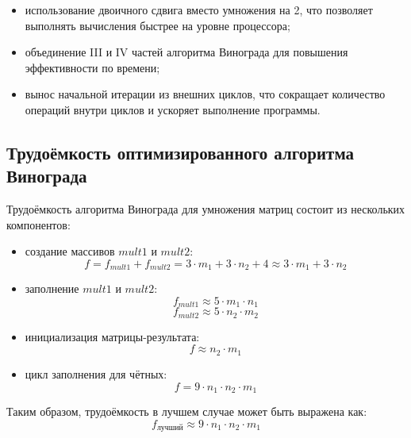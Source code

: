 \documentclass[a4paper, 12pt]{extreport}
\begin{document}
\begin{itemize}
    \item[--] использование двоичного сдвига вместо умножения на 2, что позволяет выполнять вычисления быстрее на уровне процессора;
    \item[--] объединение III и IV частей алгоритма Винограда для повышения эффективности по времени;
    \item[--] вынос начальной итерации из внешних циклов, что сокращает количество операций внутри циклов и ускоряет выполнение программы.
\end{itemize}

\subsection{Трудоёмкость оптимизированного алгоритма Винограда}

Трудоёмкость алгоритма Винограда для умножения матриц состоит из нескольких компонентов:

\begin{itemize}
    \item[--] создание массивов $mult1$ и $mult2$:
    \begin{equation}
    f = f_{mult1} + f_{mult2} = 3 \cdot m_1 + 3 \cdot n_2 + 4 \approx 3 \cdot m_1 + 3 \cdot n_2
    \end{equation}

    \item[--] заполнение $mult1$ и $mult2$:
    \begin{equation}
    f_{mult1} \approx 5 \cdot m_1 \cdot n_1
    \end{equation}
    \begin{equation}
    f_{mult2} \approx 5 \cdot n_2 \cdot m_2
    \end{equation}

    \item[--] инициализация матрицы-результата:
    \begin{equation}
    f \approx n_2 \cdot m_1
    \end{equation}

    \item[--] цикл заполнения для чётных:
    \begin{equation}
    f = 9 \cdot n_1 \cdot n_2 \cdot m_1
    \end{equation}
\end{itemize}

Таким образом, трудоёмкость в лучшем случае может быть выражена как:
\begin{equation}
f_{\text{лучший}} \approx 9 \cdot n_1 \cdot n_2 \cdot m_1
\end{equation}
\end{document}
